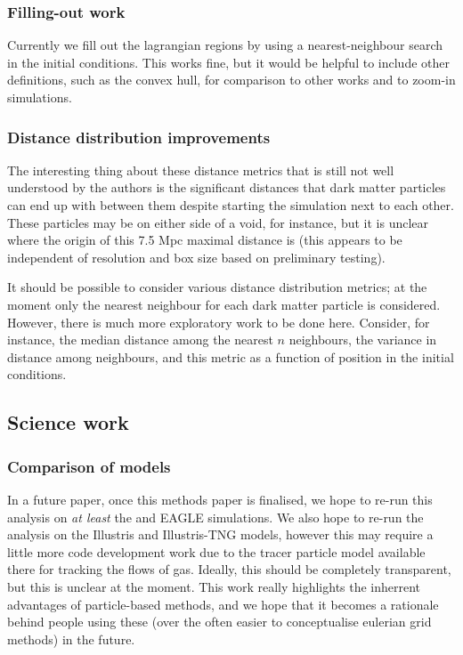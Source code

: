 \subsubsection{Filling-out work}

Currently we fill out the lagrangian regions by using a nearest-neighbour
search in the initial conditions. This works fine, but it would be helpful
to include other definitions, such as the convex hull, for comparison to 
other works and to zoom-in simulations.

\subsubsection{Distance distribution improvements}

The interesting thing about these distance metrics that is still not 
well understood by the authors is the significant distances that dark matter
particles can end up with between them despite starting the simulation
next to each other. These particles may be on either side of a void,
for instance, but it is unclear where the origin of this 7.5 Mpc maximal
distance is (this appears to be independent of resolution and box size
based on preliminary testing).

It should be possible to consider various distance distribution metrics; at the
moment only the nearest neighbour for each dark matter particle is considered.
However, there is much more exploratory work to be done here. Consider, for
instance, the median distance among the nearest $n$ neighbours, the variance in
distance among neighbours, and this metric as a function of position in the
initial conditions.

\subsection{Science work}

\subsubsection{Comparison of models}

In a future paper, once this methods paper is finalised, we hope to re-run
this analysis on \emph{at least} the \mufasa{} and EAGLE simulations. We
also hope to re-run the analysis on the Illustris and Illustris-TNG models,
however this may require a little more code development work due to the
tracer particle model available there for tracking the flows of gas. Ideally,
this should be completely transparent, but this is unclear at the moment.
This work really highlights the inherrent advantages of particle-based
methods, and we hope that it becomes a rationale behind people using these
(over the often easier to conceptualise eulerian grid methods) in the future.

